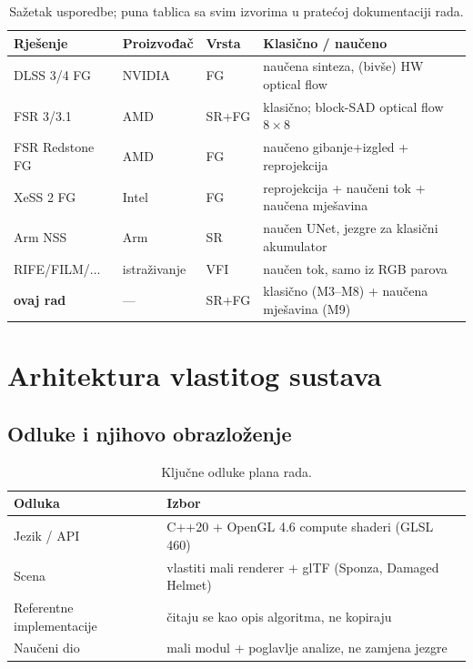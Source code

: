 \documentclass{mathos}
\begin{document}
\begin{table}[hbtp]
\centering
\small
\begin{tabular}{|l|l|l|l|}\hline
Rješenje & Proizvođač & Vrsta & Klasično / naučeno \\\hline
DLSS 3/4 FG & NVIDIA & FG & naučena sinteza, (bivše) HW optical flow \\\hline
FSR 3/3.1 & AMD & SR+FG & klasično; block-SAD optical flow $8\times8$ \\\hline
FSR Redstone FG & AMD & FG & naučeno gibanje+izgled + reprojekcija \\\hline
XeSS 2 FG & Intel & FG & reprojekcija + naučeni tok + naučena mješavina \\\hline
Arm NSS & Arm & SR & naučen UNet, jezgre za klasični akumulator \\\hline
RIFE/FILM/... & istraživanje & VFI & naučen tok, samo iz RGB parova \\\hline
\textbf{ovaj rad} & --- & SR+FG & klasično (M3--M8) + naučena mješavina (M9) \\\hline
\end{tabular}
\caption{Sažetak usporedbe; puna tablica sa svim izvorima u pratećoj
dokumentaciji rada.}
\label{table_ch3_usporedba}
\end{table}


\chapter{Arhitektura vlastitog sustava}\label{Arhitektura}

\section{Odluke i njihovo obrazloženje}

\begin{table}[hbtp]
\centering
\begin{tabular}{|l|l|}\hline
Odluka & Izbor \\\hline
Jezik / API & C++20 + OpenGL 4.6 compute shaderi (GLSL 460) \\\hline
Scena & vlastiti mali renderer + glTF (Sponza, Damaged Helmet) \\\hline
Referentne implementacije & čitaju se kao opis algoritma, ne kopiraju \\\hline
Naučeni dio & mali modul + poglavlje analize, ne zamjena jezgre \\\hline
\end{tabular}
\caption{Ključne odluke plana rada.}
\label{table_odluke}
\end{table}
\end{document}
